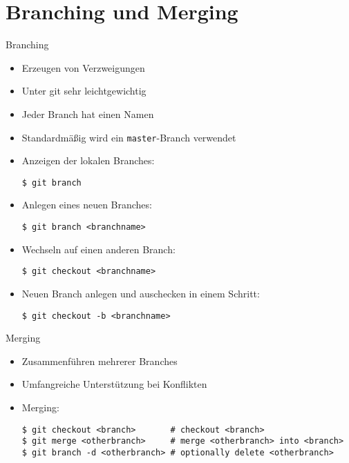 \section{Branching und Merging}

\begin{frame}
  \tableofcontents[currentsection]
\end{frame}

\begin{frame}{Branching}
  \begin{itemize}
    \item Erzeugen von Verzweigungen
    \item Unter git sehr leichtgewichtig
    \item Jeder Branch hat einen Namen
    \item Standardmäßig wird ein \texttt{master}-Branch verwendet
    \framebreak

    \item Anzeigen der lokalen Branches:
    \begin{lstlisting}
$ git branch
    \end{lstlisting}
    \item Anlegen eines neuen Branches:
    \begin{lstlisting}
$ git branch <branchname>
    \end{lstlisting}
    \item Wechseln auf einen anderen Branch:
    \begin{lstlisting}
$ git checkout <branchname>
    \end{lstlisting}
    \item Neuen Branch anlegen und auschecken in einem Schritt:
    \begin{lstlisting}
$ git checkout -b <branchname>
    \end{lstlisting}

  \end{itemize}

\end{frame}

\begin{frame}{Merging}
  \begin{itemize}
    \item Zusammenführen mehrerer Branches
    \item Umfangreiche Unterstützung bei Konflikten
    \item Merging:
    \begin{lstlisting}
$ git checkout <branch>       # checkout <branch>
$ git merge <otherbranch>     # merge <otherbranch> into <branch>
$ git branch -d <otherbranch> # optionally delete <otherbranch>
    \end{lstlisting}
  \end{itemize}
\end{frame}


